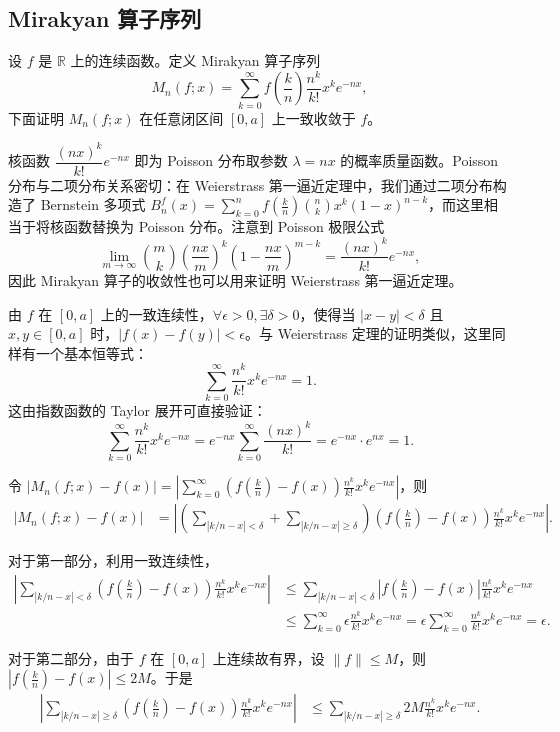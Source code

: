 \subsection{Mirakyan 算子序列}

设 $f$ 是 $\mathbb{R}$ 上的连续函数。定义 Mirakyan 算子序列
\[
M_n(f;x) = \sum_{k=0}^{\infty} f\left(\frac{k}{n}\right) \frac{n^k}{k!} x^k e^{-nx},
\]
下面证明 $M_n(f;x)$ 在任意闭区间 $[0, a]$ 上一致收敛于 $f$。

核函数 $\dfrac{(nx)^k}{k!}e^{-nx}$ 即为 Poisson 分布取参数 $\lambda = nx$ 的概率质量函数。Poisson 分布与二项分布关系密切：在 Weierstrass 第一逼近定理中，我们通过二项分布构造了 Bernstein 多项式 $B_n^f(x) = \sum_{k=0}^{n} f(\frac{k}{n}) \binom{n}{k} x^k (1-x)^{n-k}$，而这里相当于将核函数替换为 Poisson 分布。注意到 Poisson 极限公式
\[
\lim_{m \to \infty} \binom{m}{k} \left(\frac{nx}{m}\right)^k \left(1 - \frac{nx}{m}\right)^{m-k} = \frac{(nx)^k}{k!} e^{-nx},
\]
因此 Mirakyan 算子的收敛性也可以用来证明 Weierstrass 第一逼近定理。

由 $f$ 在 $[0,a]$ 上的一致连续性，$\forall \epsilon >0,\exists \delta>0$，使得当 $|x-y|<\delta$ 且 $x,y \in [0,a]$ 时，$|f(x)-f(y)|<\epsilon$。与 Weierstrass 定理的证明类似，这里同样有一个基本恒等式：
\[
\sum_{k=0}^{\infty} \frac{n^k}{k!} x^k e^{-nx} = 1.
\]
这由指数函数的 Taylor 展开可直接验证：
\[
\sum_{k=0}^{\infty} \frac{n^k}{k!} x^k e^{-nx}
= e^{-nx} \sum_{k=0}^{\infty} \frac{(nx)^k}{k!}
= e^{-nx} \cdot e^{nx} = 1.
\]

令 $|M_n(f;x)-f(x)| = \left|\sum_{k=0}^{\infty} \left(f\left(\frac{k}{n}\right) - f(x)\right)\frac{n^k}{k!} x^k e^{-nx}\right|$，则
\begin{align*}
|M_n(f;x)-f(x)|
&= \left| \left(\sum_{|k/n - x| < \delta} + \sum_{|k/n - x| \geq \delta}\right) \left(f\left(\frac{k}{n}\right) - f(x)\right) \frac{n^k}{k!} x^k e^{-nx} \right|.
\end{align*}

对于第一部分，利用一致连续性，
\begin{align*}
\left| \sum_{|k/n - x| < \delta} \left(f\left(\frac{k}{n}\right) - f(x)\right) \frac{n^k}{k!} x^k e^{-nx} \right|
&\leq \sum_{|k/n - x| < \delta} \left| f\left(\frac{k}{n}\right) - f(x) \right| \frac{n^k}{k!} x^k e^{-nx} \\
&\leq \sum_{k=0}^{\infty} \epsilon \frac{n^k}{k!} x^k e^{-nx}
= \epsilon \sum_{k=0}^{\infty} \frac{n^k}{k!} x^k e^{-nx} = \epsilon.
\end{align*}

对于第二部分，由于 $f$ 在 $[0,a]$ 上连续故有界，设 $\|f\| \leq M$，则 $|f(\frac{k}{n}) - f(x)| \leq 2M$。于是
\begin{align*}
\left| \sum_{|k/n - x| \geq \delta} \left(f\left(\frac{k}{n}\right) - f(x)\right) \frac{n^k}{k!} x^k e^{-nx} \right|
&\leq \sum_{|k/n - x| \geq \delta} 2M \frac{n^k}{k!} x^k e^{-nx}.
\end{align*}


